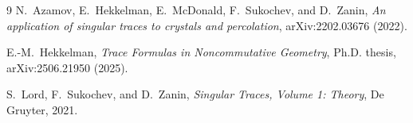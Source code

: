 \documentclass[11pt]{article}
\begin{document}
\begin{thebibliography}{9}
N.~Azamov, E.~Hekkelman, E.~McDonald, F.~Sukochev, and D.~Zanin,
\emph{An application of singular traces to crystals and percolation},
arXiv:2202.03676 (2022).

E.-M.~Hekkelman,
\emph{Trace Formulas in Noncommutative Geometry},
Ph.D. thesis, arXiv:2506.21950 (2025).

S.~Lord, F.~Sukochev, and D.~Zanin,
\emph{Singular Traces, Volume 1: Theory},
De Gruyter, 2021.
\end{thebibliography}
\end{document}
